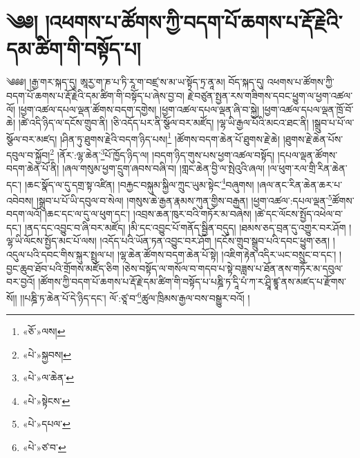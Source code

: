 \chapter{༄༅། །འཕགས་པ་ཚོགས་ཀྱི་བདག་པོ་ཆགས་པ་རྡོ་རྗེའི་དམ་ཚིག་གི་བསྟོད་པ།}༄༅༅། །རྒྱ་གར་སྐད་དུ། ཨཱརྱ་ག་ཎ་པ་ཏི་རཱ་ག་བཛྲ་ས་མ་ཡ་སྟོད་ཏྲ་ནཱ་མ། བོད་སྐད་དུ། འཕགས་པ་ཚོགས་ཀྱི་བདག་པོ་ཆགས་པ་རྡོ་རྗེའི་དམ་ཚིག་གི་བསྟོད་པ་ཞེས་བྱ་བ། རྗེ་བཙུན་སྤྱན་རས་གཟིགས་དབང་ཕྱུག་ལ་ཕྱག་འཚལ་ལོ། །ཕྱག་འཚལ་དཔལ་ལྡན་ཚོགས་བདག་དགྱེས། །ཕྱག་འཚལ་དཔལ་ལྡན་ཞི་བ་སྐྱེ། །ཕྱག་འཚལ་དཔལ་ལྡན་ཁྲོ་བོ་ཆེ། །ཚེ་འདི་ཉིད་ལ་དངོས་གྲུབ་ནི། །ཅི་འདོད་པར་ནི་སྩོལ་བར་མཛོད། །ལྷ་ཡི་རྒྱལ་པོའི་མངའ་ཐང་ནི། །སྒྲུབ་པ་པོ་ལ་སྩོལ་བར་མཛད། །ཤིན་ཏུ་ཐུགས་རྗེའི་བདག་ཉིད་པས།\footnote{«ཅོ་»ལས།} །ཚོགས་བདག་ཆེན་པོ་ཐུགས་རྗེ་ཆེ། །ཐུགས་རྗེ་ཆེན་པོས་དབུལ་བ་སྐྱོབ།\footnote{«པེ་»སྐྱབས།} །ནོར་:ལྷ་ཆེན་\footnote{«པེ་»ལ་ཆེན་}པོ་ཁྱོད་ཉིད་ལ། །བདག་ཉིད་གུས་པས་ཕྱག་འཚལ་བསྟོད། །དཔལ་ལྡན་ཚོགས་བདག་ཆེན་པོ་ནི། །ཞལ་གསུམ་ཕྱག་དྲུག་ཞབས་བཞི་བ། །གླང་ཆེན་བྱི་ལ་སྤེའུའི་ཞལ། །ལ་ཕུག་རལ་གྲི་རིན་ཆེན་དང་། །ཆང་སྣོད་ལ་དུ་དགྲ་སྟ་འཛིན། །བརྐྱང་བསྐུམ་སྐྱིལ་ཀྲུང་ཡུམ་སྟེང་\footnote{«པེ་»སྟེངས་}བཞུགས། །ཞལ་ནང་རིན་ཆེན་ཆར་པ་འབེབས། །སྒྲུབ་པ་པོ་ཡི་དབུལ་བ་སེལ། །གསུས་ཆེ་རྒྱན་རྣམས་ཀུན་གྱིས་བརྒྱན། །ཕྱག་འཚལ་:དཔལ་ལྡན་\footnote{«པེ་»དཔལ་}ཚོགས་བདག་ལའོ། །ཆང་དང་ལ་དུ་ལ་ཕུག་དང་། །འབྲས་ཆན་ཁུར་བའི་གཏོར་མ་བཞེས། །ཚེ་དང་ལོངས་སྤྱོད་འཕེལ་བ་དང་། །ནད་དང་འབྱུང་བ་ཞི་བར་མཛོད། །མི་དང་འབྱུང་པོ་གནོད་སྦྱིན་བདུད། །ཐམས་ཅད་བྲན་དུ་འགྱུར་བར་ཤོག །ལྷ་ཡི་ལོངས་སྤྱོད་མང་པོ་ལས། །འདོད་པའི་ཡོན་ཏན་འབྱུང་བར་ཤོག །དངོས་གྲུབ་སྒྲུབ་པའི་དབང་ཕྱུག་ཅན། །འདུལ་པའི་དབང་གིས་སྐུར་སྤྲུལ་པ། །ལྷ་ཆེན་ཚོགས་བདག་ཆེན་པོ་སྟེ། །འཇིག་རྟེན་འདིར་ཡང་བསྲུང་བ་དང་། །བྱང་ཆུབ་ཐོབ་པའི་གྲོགས་མཛོད་ཅིག །ཅེས་བསྟོད་ལ་གསོལ་བ་གདབ་པ་སྟེ་བཟླས་པ་ཐོན་ནས་གཏོར་མ་དབུལ་བར་བྱའོ། །ཚོགས་ཀྱི་བདག་པོ་ཆགས་པ་རྡོ་རྗེ་དམ་ཚིག་གི་བསྟོད་པ་པཎྜི་ཏ་དཱི་པཾ་ཀ་ར་ཤྲཱི་ཛྙཱ་ནས་མཛད་པ་རྫོགས་སོ།། །།པཎྜི་ཏ་ཆེན་པོ་དེ་ཉིད་དང་། ལོ་:ཙཱ་བ་\footnote{«པེ་»ཙ་བ་}ཚུལ་ཁྲིམས་རྒྱལ་བས་བསྒྱུར་བའོ། ། 
